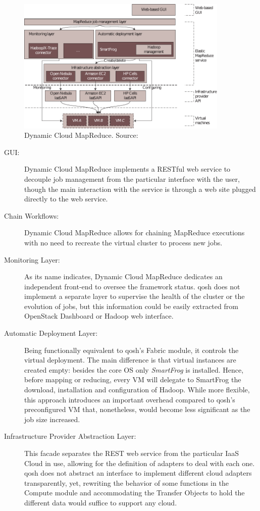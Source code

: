 \begin{figure}[tbp]
\begin{center}
\includegraphics[width=0.9\textwidth]{imagenes/037.pdf}
 \caption{Dynamic Cloud MapReduce. Source: \cite{dynamicmapreduce}}
\label{fig:arquitecturadynamicmapreduce}
\end{center}
\end{figure}

\begin{description}
    \item[GUI:] Dynamic Cloud MapReduce implements a RESTful web service to decouple job management from the particular interface with the user, though the main interaction with the service is through a web site plugged directly to the web service.
    \item[Chain Workflows:] Dynamic Cloud MapReduce allows for chaining MapReduce executions with no need to recreate the virtual cluster to process new jobs.
    \item[Monitoring Layer:] As its name indicates, Dynamic Cloud MapReduce dedicates an independent front-end to oversee the framework status. qosh does not implement a separate layer to supervise the health of the cluster or the evolution of jobs, but this information could be easily extracted from OpenStack Dashboard or Hadoop web interface.
    \item[Automatic Deployment Layer:] Being functionally equivalent to qosh's Fabric module, it controls the virtual deployment. The main difference is that virtual instances are created empty: besides the core OS only \emph{SmartFrog} is installed. Hence, before mapping or reducing, every VM will delegate to SmartFrog the download, installation and configuration of Hadoop.
    While more flexible, this approach introduces an important overhead compared to qosh's preconfigured VM that, nonetheless, would become less significant as the job size increased.
    \item[Infrastructure Provider Abstraction Layer:] This facade separates the REST web service from the particular IaaS Cloud in use, allowing for the definition of adapters to deal with each one. qosh does not abstract an interface to implement different cloud adapters transparently, yet, rewriting the behavior of some functions in the Compute module and accommodating the Transfer Objects to hold the different data would suffice to support any cloud.
\end{description}

